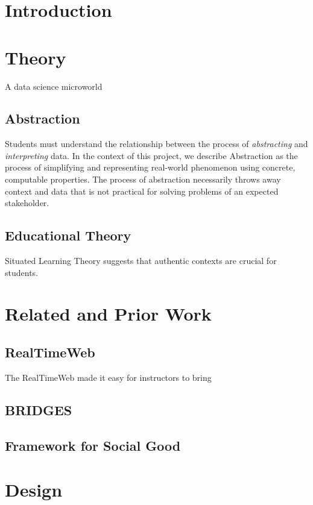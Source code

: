 \documentclass{sig-alternate}
\begin{document}
\section{Introduction}

\section{Theory}

A data science microworld

\subsection{Abstraction}

Students must understand the relationship between the process of \textit{abstracting} and \textit{interpreting} data.
In the context of this project, we describe Abstraction as the process of simplifying and representing real-world phenomenon using concrete, computable properties.
The process of abstraction necessarily throws away context and data that is not practical for solving problems of an expected stakeholder.

\subsection{Educational Theory}

Situated Learning Theory suggests that authentic contexts are crucial for students.

\section{Related and Prior Work}

\subsection{RealTimeWeb}

The RealTimeWeb made it easy for instructors to bring 

\subsection{BRIDGES}

\subsection{Framework for Social Good}

\section{Design}
\end{document}
